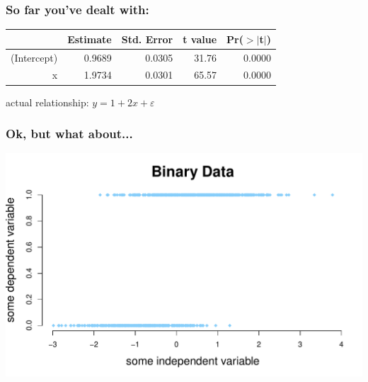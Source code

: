 \documentclass[aspectratio=169]{beamer}
\begin{document}
\begin{frame}
\frametitle{So far you've dealt with:}
\begin{table}[ht]
\centering
\begin{tabular}{rrrrr}
  \hline
 & Estimate & Std. Error & t value & Pr($>$$|$t$|$) \\ 
  \hline
(Intercept) & 0.9689 & 0.0305 & 31.76 & 0.0000 \\ 
  x & 1.9734 & 0.0301 & 65.57 & 0.0000 \\ 
   \hline
\end{tabular}
\end{table}

\begin{center}\Large
actual relationship: $y = 1 + 2x + \varepsilon$
\end{center}

\end{frame}

\begin{frame}
\frametitle{Ok, but what about...}
\begin{center}
\includegraphics[scale=0.55]{binary_data.pdf}
\end{center}
\end{frame}
\end{document}
